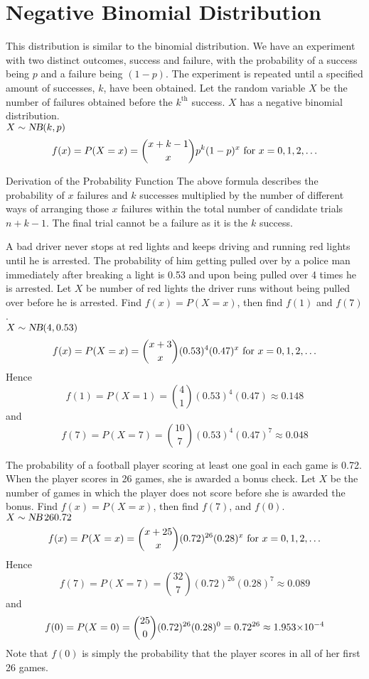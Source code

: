 \section{Negative Binomial Distribution}
This distribution is similar to the binomial distribution. We have an experiment with two distinct outcomes, success and failure, with the probability of a success being $p$ and a failure being $(1-p)$. The experiment is repeated until a specified amount of successes, $k$, have been obtained. Let the random variable $X$ be the number of failures obtained before the $k^\text{th}$ success. $X$ has a negative binomial distribution. \\
$X\sim\operatorname{\textsl{NB}}(k,p)$
\[
    f(x) = P(X = x) = \binom{x+k-1}{x} p^k (1-p)^x \text{ for } x = 0,1,2,\ldots
\]
\begin{theory}{Derivation of the Probability Function}
The above formula describes the probability of $x$ failures and $k$ successes multiplied by the number of different ways of arranging those $x$ failures within the total number of candidate trials $n+k-1$. The final trial cannot be a failure as it is the $k$ success.
\end{theory}
\begin{example}
A bad driver never stops at red lights and keeps driving and running red lights until he is arrested. The probability of him getting pulled over by a police man immediately after breaking a light is 0.53 and upon being pulled over 4 times he is arrested. Let $X$ be number of red lights the driver runs without being pulled over before he is arrested. Find $f(x)=P(X=x)$, then find $f(1)$ and $f(7)$. \\
$X\sim\operatorname{\textsl{NB}}(4,0.53)$ 
\[
    f(x) = P(X = x) = \binom{x+3}{x} (0.53)^4 (0.47)^x \text{ for } x = 0,1,2,\ldots
\]
Hence 
\[
    f(1) = P(X = 1) = \binom{4}{1} (0.53)^4 (0.47) \approx 0.148
\]
and
\[
    f(7) = P(X = 7) = \binom{10}{7} (0.53)^4 (0.47)^7 \approx 0.048
\]
\end{example}
\begin{example}
The probability of a football player scoring at least one goal in each game is 0.72. When the player scores in 26 games, she is awarded a bonus check. Let $X$ be the number of games in which the player does not score before she is awarded the bonus. Find $f(x)=P(X=x)$, then find $f(7)$, and $f(0)$. \\
$X\sim\operatorname{\textsl{NB}}{26}{0.72}$ 
\[
    f(x) = P(X = x) = \binom{x+25}{x} (0.72)^{26} (0.28)^x \text{ for } x=0,1,2,\ldots
\]
Hence 
\[
    f(7) = P(X = 7) = \binom{32}{7} (0.72)^{26} (0.28)^7 \approx 0.089
\]
and 
\[
    f(0) = P(X = 0) = \binom{25}{0} (0.72)^{26} (0.28)^0 = 0.72^{26} \approx {1.953}{\times}10^{-4}
\]
Note that $f(0)$ is simply the probability that the player scores in all of her first 26 games.
\end{example}

